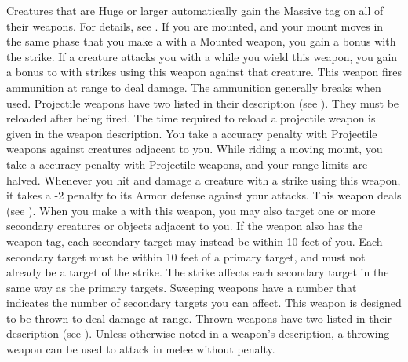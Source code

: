     Creatures that are Huge or larger automatically gain the Massive tag on all of their weapons.
    For details, see .
    \label{Mounted Weapon} If you are mounted, and your mount moves in the same phase that you make a  with a Mounted weapon, you gain a   bonus with the strike.
     If a creature attacks you with a   while you wield this weapon, you  gain a  bonus to  with strikes using this weapon against that creature.
     This weapon fires ammunition at range to deal damage.
    The ammunition generally breaks when used.
    Projectile weapons have two  listed in their description (see ).
    They must be reloaded after being fired.
    The time required to reload a projectile weapon is given in the weapon description.
    You take a  accuracy penalty with Projectile weapons against creatures adjacent to you.
    While riding a moving mount, you take a  accuracy penalty with Projectile weapons, and your range limits are halved.
     Whenever you hit and damage a creature with a strike using this weapon, it  takes a -2 penalty to its Armor defense against your attacks.
     This weapon deals  (see ).
    \label{Sweeping} When you make a   with this weapon, you may also target one or more secondary creatures or objects adjacent to you.
    If the weapon also has the  weapon tag, each secondary target may instead be within 10 feet of you.
    Each secondary target must be within 10 feet of a primary target, and must not already be a target of the strike.
    The strike affects each secondary target in the same way as the primary targets.
    Sweeping weapons have a number that indicates the number of secondary targets you can affect.
     This weapon is designed to be thrown to deal damage at range.
    Thrown weapons have two  listed in their description (see ).
    Unless otherwise noted in a weapon's description, a throwing weapon can be used to attack in melee without penalty.

